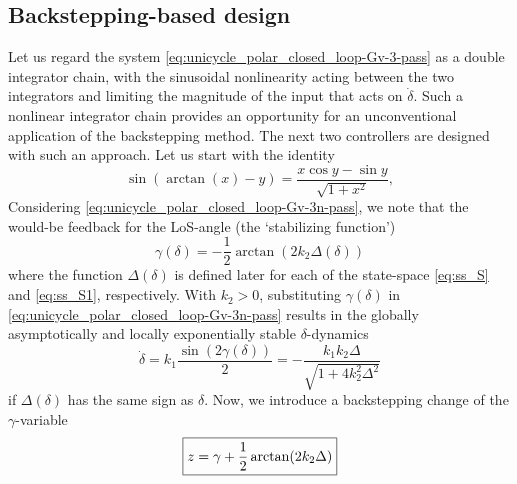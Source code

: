 \documentclass[letterpaper, 10 pt, conference]{ieeeconf}  %
\begin{document}
\subsection{Backstepping-based design}
Let us regard the system \eqref{eq:unicycle_polar_closed_loop-Gv-3-pass} as a double integrator chain, with the sinusoidal nonlinearity acting between the two integrators and limiting the magnitude of the input that acts on $\dot\delta$. Such a nonlinear integrator chain provides an opportunity for an unconventional application of the backstepping method. The next two controllers are designed with such an approach. 
Let us start with the identity
\begin{equation}
\sin(\arctan(x)-y) = \frac{x\cos y - \sin y}{\sqrt{1+x^2}},
\end{equation}
Considering \eqref{eq:unicycle_polar_closed_loop-Gv-3n-pass}, 
we note that the would-be feedback for the LoS-angle (the `stabilizing function') 
\begin{equation}
\gamma(\delta) = -\frac{1}{2} \arctan(2k_2 \Delta(\delta)) %
\end{equation}
where the function $\Delta(\delta)$  is defined later for each of the state-space \eqref{eq:ss_S} and \eqref{eq:ss_S1}, respectively. With $k_2 > 0$, substituting 
$\gamma(\delta)$ in \eqref{eq:unicycle_polar_closed_loop-Gv-3n-pass} results in the globally asymptotically and locally exponentially stable $\delta$-dynamics
\begin{equation}
\dot{\delta} = k_1\frac{\sin(2\gamma(\delta))}{2} 
= - \frac{k_1 k_2 \Delta}{\sqrt{1+4 k_2 ^2\Delta^2}}
\end{equation} 
if $\Delta(\delta)$ has the same sign as $\delta$.
Now, we introduce a backstepping change of the $\gamma$-variable
\begin{align}
\label{eq:backstepping_z}
\fbox{$\displaystyle z = \gamma + \frac{1}{2}\arctan(2 k_2 \Delta)$}
\end{align}
\end{document}
